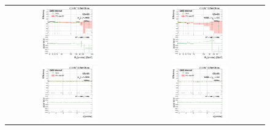 \begin{figure}[bh]
  \begin{center}
    \begin{tabular}{cc}
      \includegraphics[width=0.45\textwidth]{figures/Zprime/2017/ScaleFactor/SameSign/N-1/g_compare_cut_Et_Barrel_ea_ta_inc_AS_N_1_TrkIso_PUW.png} &
      \includegraphics[width=0.45\textwidth]{figures/Zprime/2017/ScaleFactor/SameSign/N-1/g_compare_cut_Et_Endcap_ea_ta_inc_AS_N_1_TrkIso_PUW.png} \\
      \includegraphics[width=0.45\textwidth]{figures/Zprime/2017/ScaleFactor/SameSign/N-1/g_compare_cut_phi_Barrel_ea_ta_inc_AS_N_1_TrkIso_PUW.png} &
      \includegraphics[width=0.45\textwidth]{figures/Zprime/2017/ScaleFactor/SameSign/N-1/g_compare_cut_phi_Endcap_ea_ta_inc_AS_N_1_TrkIso_PUW.png} \\

\end{tabular}
\end{center}
\end{figure}
